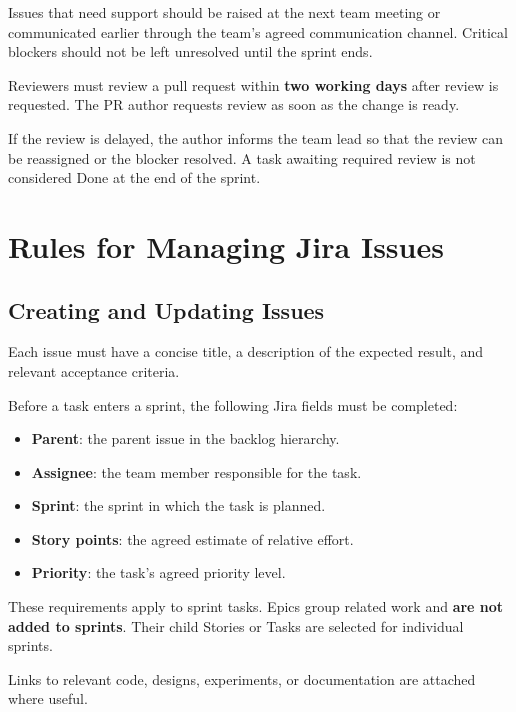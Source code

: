 \documentclass[12pt,a4paper]{article}
\begin{document}
Issues that need support should be raised at the next team meeting or
communicated earlier through the team's agreed communication channel.
Critical blockers should not be left unresolved until the sprint ends.

Reviewers must review a pull request within \textbf{two working days}
after review is requested. The PR author requests review as soon
as the change is ready.

If the review is delayed, the author informs the team lead
so that the review can be reassigned or the blocker resolved.
A task awaiting required review is not considered Done
at the end of the sprint.


\section{Rules for Managing Jira Issues}

\subsection{Creating and Updating Issues}

Each issue must have a concise title, a description of the
expected result, and relevant acceptance criteria.

Before a task enters a sprint, the following Jira fields
must be completed:

\begin{itemize}
    \item \textbf{Parent}: the parent issue in the backlog hierarchy.
    \item \textbf{Assignee}: the team member responsible for the task.
    \item \textbf{Sprint}: the sprint in which the task is planned.
    \item \textbf{Story points}: the agreed estimate of relative effort.
    \item \textbf{Priority}: the task's agreed priority level.
\end{itemize}

These requirements apply to sprint tasks.
Epics group related work and \textbf{are not added to sprints}.
Their child Stories or Tasks are selected for individual sprints.

Links to relevant code, designs, experiments, or documentation
are attached where useful.
\end{document}
